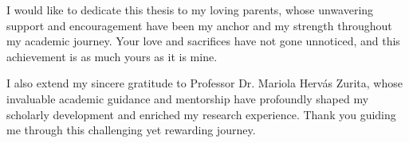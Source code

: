 
\begin{dedication}

    I would like to dedicate this thesis to my loving parents, whose unwavering support and encouragement have been my anchor and my strength throughout my academic journey. Your love and sacrifices have not gone unnoticed, and this achievement is as much yours as it is mine.
    
    I also extend my sincere gratitude to Professor Dr. Mariola Hervás Zurita, whose invaluable academic guidance and mentorship have profoundly shaped my scholarly development and enriched my research experience. Thank you guiding me through this challenging yet rewarding journey.
    
\end{dedication}